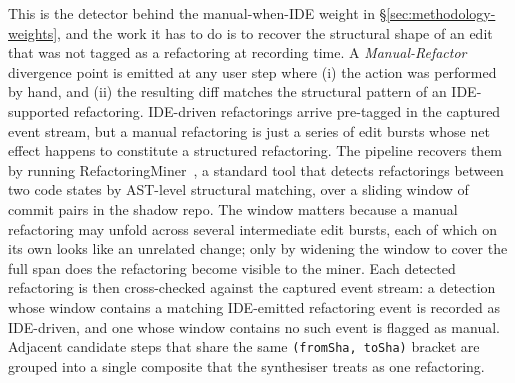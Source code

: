 This is the detector behind the manual-when-IDE weight in \S\ref{sec:methodology-weights}, and the work it has to do is to recover the structural shape of an edit that was not tagged as a refactoring at recording time. A \emph{Manual-Refactor} divergence point is emitted at any user step where (i) the action was performed by hand, and (ii) the resulting diff matches the structural pattern of an IDE-supported refactoring. IDE-driven refactorings arrive pre-tagged in the captured event stream, but a manual refactoring is just a series of edit bursts whose net effect happens to constitute a structured refactoring. The pipeline recovers them by running RefactoringMiner~\cite{alikhanifard2025rminer}, a standard tool that detects refactorings between two code states by AST-level structural matching, over a sliding window of commit pairs in the shadow repo. The window matters because a manual refactoring may unfold across several intermediate edit bursts, each of which on its own looks like an unrelated change; only by widening the window to cover the full span does the refactoring become visible to the miner. Each detected refactoring is then cross-checked against the captured event stream: a detection whose window contains a matching IDE-emitted refactoring event is recorded as IDE-driven, and one whose window contains no such event is flagged as manual. Adjacent candidate steps that share the same \texttt{(fromSha, toSha)} bracket are grouped into a single composite that the synthesiser treats as one refactoring.

